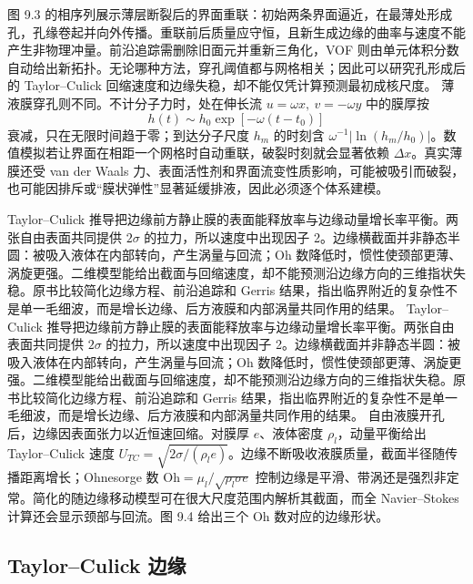 \documentclass[11pt,a4paper,openany,fontset=none]{ctexbook}
\begin{document}
图 9.3 的相序列展示薄层断裂后的界面重联：初始两条界面逼近，在最薄处形成孔，孔缘卷起并向外传播。重联前后质量应守恒，且新生成边缘的曲率与速度不能产生非物理冲量。前沿追踪需删除旧面元并重新三角化，VOF 则由单元体积分数自动给出新拓扑。无论哪种方法，穿孔阈值都与网格相关；因此可以研究孔形成后的 Taylor--Culick 回缩速度和边缘失稳，却不能仅凭计算预测最初成核尺度。
薄液膜穿孔则不同。不计分子力时，处在伸长流
$u=\omega x,\ v=-\omega y$ 中的膜厚按
\begin{equation}
 h(t)\sim h_0\exp[-\omega(t-t_0)]
\end{equation}
衰减，只在无限时间趋于零；到达分子尺度 $h_m$ 的时刻含
$\omega^{-1}|\ln(h_m/h_0)|$。数值模拟若让界面在相距一个网格时自动重联，破裂时刻就会显著依赖 $\Delta x$。真实薄膜还受 van der Waals 力、表面活性剂和界面流变性质影响，可能被吸引而破裂，也可能因排斥或“膜状弹性”显著延缓排液，因此必须逐个体系建模。

Taylor--Culick 推导把边缘前方静止膜的表面能释放率与边缘动量增长率平衡。两张自由表面共同提供 $2\sigma$ 的拉力，所以速度中出现因子 2。边缘横截面并非静态半圆：被吸入液体在内部转向，产生涡量与回流；Oh 数降低时，惯性使颈部更薄、涡旋更强。二维模型能给出截面与回缩速度，却不能预测沿边缘方向的三维指状失稳。原书比较简化边缘方程、前沿追踪和 Gerris 结果，指出临界附近的复杂性不是单一毛细波，而是增长边缘、后方液膜和内部涡量共同作用的结果。
Taylor--Culick 推导把边缘前方静止膜的表面能释放率与边缘动量增长率平衡。两张自由表面共同提供 $2\sigma$ 的拉力，所以速度中出现因子 2。边缘横截面并非静态半圆：被吸入液体在内部转向，产生涡量与回流；Oh 数降低时，惯性使颈部更薄、涡旋更强。二维模型能给出截面与回缩速度，却不能预测沿边缘方向的三维指状失稳。原书比较简化边缘方程、前沿追踪和 Gerris 结果，指出临界附近的复杂性不是单一毛细波，而是增长边缘、后方液膜和内部涡量共同作用的结果。
自由液膜开孔后，边缘因表面张力以近恒速回缩。对膜厚 $e$、液体密度 $\rho_l$，动量平衡给出 Taylor--Culick 速度 $U_{TC}=\sqrt{2\sigma/(\rho_l e)}$。边缘不断吸收液膜质量，截面半径随传播距离增长；Ohnesorge 数 $\mathrm{Oh}=\mu_l/\sqrt{\rho_l\sigma e}$ 控制边缘是平滑、带涡还是强烈非定常。简化的随边缘移动模型可在很大尺度范围内解析其截面，而全 Navier--Stokes 计算还会显示颈部与回流。图 9.4 给出三个 Oh 数对应的边缘形状。
\subsection{Taylor--Culick 边缘}
\end{document}

